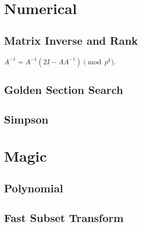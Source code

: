 \documentclass{article}
\begin{document}
\section{Numerical}
    \subsection{Matrix Inverse and Rank}
        $A^{-1}=A^{-1}(2I-AA^{-1})\pmod{p^k}$.
        
    \subsection{Golden Section Search}
        
    \subsection{Simpson}
        
\section{Magic}
    \subsection{Polynomial}
        
    \subsection{Fast Subset Transform}
        
\end{document}
